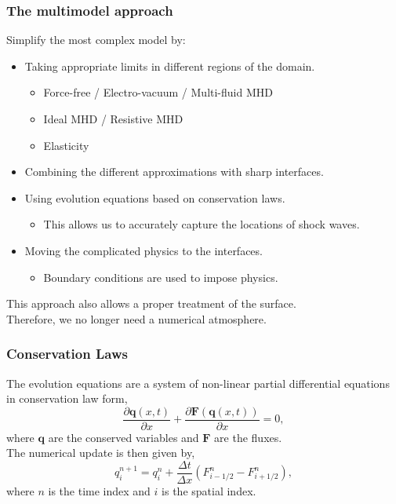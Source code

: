 \documentclass{beamer}
\begin{document}
\begin{frame}
\frametitle{The multimodel approach}
Simplify the most complex model by:
\begin{itemize}
\item{Taking appropriate limits in different regions of the domain.}
\begin{itemize}
\item{Force-free / Electro-vacuum / Multi-fluid MHD}
\item{Ideal MHD / Resistive MHD}
\item{Elasticity}
\end{itemize}
\item{Combining the different approximations with sharp interfaces.}
\item{Using evolution equations based on conservation laws.}
\begin{itemize}
\item{This allows us to accurately capture the locations of shock waves.}
\end{itemize}
\item{Moving the complicated physics to the interfaces.}
\begin{itemize}
\item{Boundary conditions are used to impose physics.}
\end{itemize}
\end{itemize}
This approach also allows a proper treatment of the surface. \\
Therefore, we no longer need a numerical atmosphere. 
\end{frame}

\begin{frame}
\frametitle{Conservation Laws}
The evolution equations are a system of non-linear partial differential equations in conservation law form,
\begin{equation}
\frac{\partial \mathbf{q}(x,t)}{\partial x}  + \frac{\partial \mathbf{F}(\mathbf{q}(x,t))}{\partial x} = 0,
\end{equation}
where $\mathbf{q}$ are the conserved variables and $\mathbf{F}$ are the fluxes.\\
The numerical update is then given by,
\begin{equation}
q^{n+1}_i = q^n_i + \frac{\Delta t}{\Delta x} \left(F^n_{i-1/2} - F^n_{i+1/2}\right),
\end{equation}
where $n$ is the time index and $i$ is the spatial index.
\end{frame}
\end{document}
